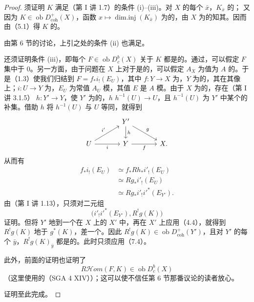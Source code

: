 \begin{proof}
须证明 $K$ 满足（第 I 讲 1.7）的条件 (i)--(iii)。对 $X$ 的每个 $\bar x$，$K_{\bar x}$ 的；
又因为 $K\in\operatorname{ob}D^+_{\mathrm{coh}}(X)$，函数 $x\mapsto\operatorname{dim.inj}(K_{\bar x})$ 为的，由 $X$ 为的知其。因而由（5.1）得 $K$ 的。

由第 6 节的讨论，上引之处的条件 (ii) 也满足。

还须证明条件 (iii)，即每个 $F\in\operatorname{ob}D_c^b(X)$ 关于 $K$ 都是的。通过，可以假定 $F$ 集中于 $0$。另一方面，由于问题在 $X$ 上对于是的，可以假定 $A_X$ 为值为 $A$ 的。于是（1.3）使我们归结到 $F=f_*i_!(E_U)$，其中 $f:Y\to X$ 为，$Y$ 为的，其在其像上；$i:U\to Y$ 为，$E_U$ 为常值 $A_U$ 模，其值 $E$ 是 $A$ 模。由于 $X$ 为的，存在（第 I 讲 3.1.5） $h:Y'\to Y$，使 $Y'$ 为的，$h$  $h^{-1}(U)\to U$，且 $h^{-1}(U)$ 为 $Y'$ 中某个的补集。借助 $h$ 将 $h^{-1}(U)$ 与 $U$ 等同，就得到
\[
\begin{tikzcd}[column sep=large]
&Y'\arrow[d,"h"]\arrow[dr,"g"]&\\
U\arrow[ur,"i'"]\arrow[r,"i"']&Y\arrow[r,"f"']&X.
\end{tikzcd}
\]
从而有
\begin{align*}
f_*i_!(E_U)&\simeq f_*Rh_*i'_!(E_U)\\
&\simeq Rg_*i'_!(E_U)\\
&\simeq Rg_*i'_!i'^*(E_{Y'}).
\end{align*}
由（第 I 讲 1.13），只须对二元组
\[
\bigl(i'_!i'^*(E_{Y'}),R^!g(K)\bigr)
\]
证明。但将 $Y'$ 地到一个在 $X$ 上的 $X'$ 中，再在 $X'$ 上应用（4.4），就得到 $R^!g(K)$ 地于 $g^*(K)$，差一个。因此 $R^!g(K)\in\operatorname{ob}D^+_{\mathrm{coh}}(Y')$，且对 $Y'$ 的每个 $\bar y$，$R^!g(K)_{\bar y}$ 都是的。此时只须应用（7.4）。

此外，前面的证明也证明了
\[
R\mathcal Hom(F,K)\in\operatorname{ob}D_c^b(X)
\]
（这里使用的（SGA 4 XIV））；这可以使不信任第 6 节那番议论的读者放心。

证明至此完成。
\end{proof}

